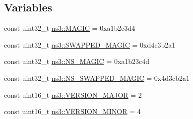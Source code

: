 \subsection*{Variables}
\begin{DoxyCompactItemize}
\item 
const uint32\+\_\+t \hyperlink{namespacens3_a19e4b16597efe38cbfa2033c9988f224}{ns3\+::\+M\+A\+G\+IC} = 0xa1b2c3d4
\item 
const uint32\+\_\+t \hyperlink{namespacens3_a687c5411ecbe4c7766c70c1226eef2d3}{ns3\+::\+S\+W\+A\+P\+P\+E\+D\+\_\+\+M\+A\+G\+IC} = 0xd4c3b2a1
\item 
const uint32\+\_\+t \hyperlink{namespacens3_aa3cf3e7390afab115718e01fb671fdb9}{ns3\+::\+N\+S\+\_\+\+M\+A\+G\+IC} = 0xa1b23c4d
\item 
const uint32\+\_\+t \hyperlink{namespacens3_a244fa8ad695b47f296e942ea5f0bb46b}{ns3\+::\+N\+S\+\_\+\+S\+W\+A\+P\+P\+E\+D\+\_\+\+M\+A\+G\+IC} = 0x4d3cb2a1
\item 
const uint16\+\_\+t \hyperlink{namespacens3_ac952f36545c1876b7ea895dbd521afb9}{ns3\+::\+V\+E\+R\+S\+I\+O\+N\+\_\+\+M\+A\+J\+OR} = 2
\item 
const uint16\+\_\+t \hyperlink{namespacens3_a8aab01f6e71af7830eedfec5ff333ef4}{ns3\+::\+V\+E\+R\+S\+I\+O\+N\+\_\+\+M\+I\+N\+OR} = 4
\end{DoxyCompactItemize}

